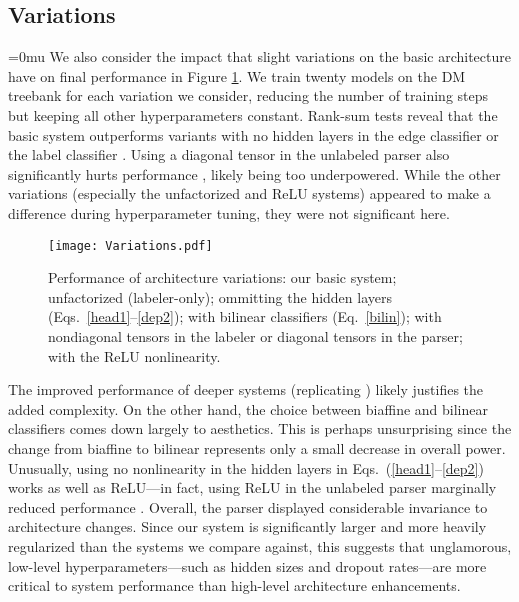 \documentclass[11pt,a4paper]{article}
\begin{document}
\subsection{Variations}
\thickmuskip=0mu
We also consider the impact that slight variations on the basic architecture have on final performance in Figure \ref{variations}. We train twenty models on the DM treebank for each variation we consider, reducing the number of training steps but keeping all other hyperparameters constant. Rank-sum tests \citep{LehmannDAbrera1975} reveal that the basic system outperforms variants with no hidden layers in the edge classifier  or the label classifier . Using a diagonal tensor  in the unlabeled parser also significantly hurts performance , likely being too underpowered. While the other variations (especially the unfactorized and ReLU systems) appeared to make a difference during hyperparameter tuning, they were not significant here.

\begin{figure}
  \texttt{[image: Variations.pdf]}
  \caption{Performance of architecture variations: our basic system; unfactorized (labeler-only); ommitting the hidden layers (Eqs.\ \ref{head1}--\ref{dep2}); with bilinear classifiers (Eq.\ \ref{bilin}); with nondiagonal tensors in the labeler or diagonal tensors in the parser; with the ReLU nonlinearity.}
  \label{variations}
\end{figure}
The improved performance of deeper systems (replicating \citet{DozatManning2017}) likely justifies the added complexity. On the other hand, the choice between biaffine and bilinear classifiers comes down largely to aesthetics. This is perhaps unsurprising since the change from biaffine to bilinear represents only a small decrease in overall power. Unusually, using no nonlinearity in the hidden layers in Eqs.\ (\ref{head1}--\ref{dep2}) works as well as ReLU---in fact, using ReLU in the unlabeled parser marginally reduced performance . Overall, the parser displayed considerable invariance to architecture changes. Since our system is significantly larger and more heavily regularized than the systems we compare against, this suggests that unglamorous, low-level hyperparameters---such as hidden sizes and dropout rates---are more critical to system performance than high-level architecture enhancements. 
\end{document}
